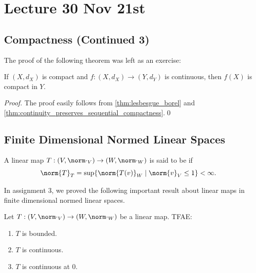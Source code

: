 \documentclass[notoc,notitlepage]{tufte-book}
\begin{document}

\chapter{Lecture 30 Nov 21st}%
\label{chp:lecture_30_nov_21st}

\section{Compactness (Continued 3)}%
\label{sec:compactness_continued_3}

The proof of the following theorem was left as an exercise:

\begin{thm}\label{thm:continuity_preserves_compactness}
  If $(X, d_X)$ is compact and $f : (X, d_X) \to (Y, d_Y)$ is continuous, then $f(X)$ is compact in $Y$.
\end{thm}

\begin{proof}
  The proof easily follows from \cref{thm:lesbesgue_borel} and \cref{thm:continuity_preserves_sequential_compactness}.\qed\
\end{proof}


\section{Finite Dimensional Normed Linear Spaces}%
\label{sec:finite_dimensional_normed_linear_spaces}

\begin{defn}[Bounded Linear Map]\label{defn:bounded_linear_map}
  A linear map $T : (V, \norm\cdot_V) \to (W, \norm\cdot_W)$ is said to be  if
  \begin{equation*}
    \norm{T}_T = \sup \{ \norm{T(v)}_W \mid \norm{v}_V \leq 1 \} < \infty.
  \end{equation*}
\end{defn}

In assignment 3, we proved the following important result about linear maps in finite dimensional normed linear spaces.

\begin{thm}\label{thm:boundedness_is_equivalent_to_continuity_in_finite_dimensional_normed_linear_spaces}
  Let $T : ( V, \norm\cdot_V ) \to (W, \norm\cdot_W)$ be a linear map. TFAE:
  \begin{enumerate}
    \item $T$ is bounded.
    \item $T$ is continuous.
    \item $T$ is continuous at $0$.
  \end{enumerate}
\end{thm}
\end{document}
